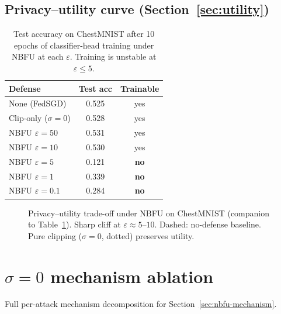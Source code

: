 \documentclass[11pt]{article}
\begin{document}
\subsection{Privacy--utility curve (Section~\ref{sec:utility})}
\label{app:utility-table}
\begin{table}[h]
\centering
\small
\setlength{\tabcolsep}{4pt}
\begin{tabular}{lcc}
\toprule
Defense & Test acc & Trainable \\
\midrule
None (FedSGD) & 0.525 & yes \\
Clip-only ($\sigma{=}0$) & 0.528 & yes \\
NBFU $\varepsilon{=}50$ & 0.531 & yes \\
NBFU $\varepsilon{=}10$ & 0.530 & yes \\
NBFU $\varepsilon{=}5$  & 0.121 & \textbf{no} \\
NBFU $\varepsilon{=}1$  & 0.339 & \textbf{no} \\
NBFU $\varepsilon{=}0.1$ & 0.284 & \textbf{no} \\
\bottomrule
\end{tabular}
\caption{Test accuracy on ChestMNIST after 10 epochs of classifier-head training under NBFU at each $\varepsilon$. Training is unstable at $\varepsilon{\le}5$.}
\label{tab:utility}
\end{table}

\begin{figure}[h]
\centering

\caption{Privacy--utility trade-off under NBFU on ChestMNIST (companion to Table~\ref{tab:utility}). Sharp cliff at $\varepsilon{\approx}5$--$10$. Dashed: no-defense baseline. Pure clipping ($\sigma{=}0$, dotted) preserves utility.}
\label{fig:utility}
\end{figure}

\section{$\sigma{=}0$ mechanism ablation}
\label{app:mechanism}
Full per-attack mechanism decomposition for Section~\ref{sec:nbfu-mechanism}.
\end{document}
